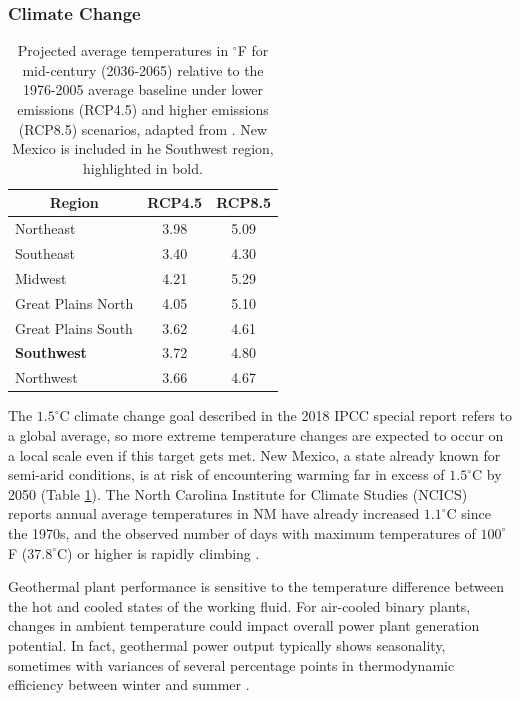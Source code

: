 \subsubsection{Climate Change}\label{ch4:climate_uncertainty}
\begin{table}
\centering
\begin{tabular}{|l|c|c|}
\hline
\multicolumn{1}{|c|}{\textbf{Region}} & \textbf{RCP4.5} & \textbf{RCP8.5} \\ \hline
Northeast & 3.98 & 5.09 \\ \hline
Southeast & 3.40 & 4.30 \\ \hline
Midwest & 4.21 & 5.29 \\ \hline
Great Plains North & 4.05 & 5.10 \\ \hline
Great Plains South & 3.62 & 4.61 \\ \hline
\textbf{Southwest} & 3.72 & 4.80 \\ \hline
Northwest & 3.66 & 4.67 \\ \hline
\end{tabular}
\caption[Projected regional temperature changes]{Projected average temperatures in $^\circ$F for mid-century (2036-2065) relative to the 1976-2005 average baseline under lower emissions (RCP4.5) and higher emissions (RCP8.5) scenarios, adapted from \protect\citep[Table 6.4]{vose_temperature_2017}. New Mexico is included in he Southwest region, highlighted in bold.}
\label{tab:reg_climate}
\end{table}

The $1.5^\circ$C climate change goal described in the 2018 IPCC special report \citep{ipcc_global_2018} refers to a global average, so more extreme temperature changes are expected to occur on a local scale even if this target gets met. New Mexico, a state already known for semi-arid conditions, is at risk of encountering warming far in excess of $1.5^\circ$C by 2050 (Table \ref{tab:reg_climate}). The North Carolina Institute for Climate Studies (NCICS) reports annual average temperatures in NM have already increased $1.1^\circ$C since the 1970s, and the observed number of days with maximum temperatures of $100^\circ$F ($37.8^\circ$C) or higher is rapidly climbing \citep{frankson_new_2019}.

Geothermal plant performance is sensitive to the temperature difference between the hot and cooled states of the working fluid. For air-cooled binary plants, changes in ambient temperature could impact overall power plant generation potential. In fact, geothermal power output typically shows seasonality, sometimes with variances of several percentage points in thermodynamic efficiency between winter and summer \citep[p.\ 52]{glassley_geothermal_2015}.  

